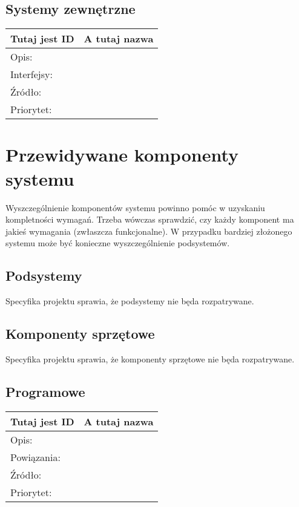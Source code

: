 \documentclass[a4paper,10pt]{article}
\begin{document}
\subsection{Systemy zewnętrzne}

\begin{center}
\begin{tabular}{|l|l|} \hline

Tutaj jest ID & A tutaj nazwa \\ \hline
Opis: &  \\ \hline
Interfejsy: &  \\ \hline
Źródło: &  \\ \hline
Priorytet: &  \\ \hline

\end{tabular}
\end{center}

\section{Przewidywane komponenty systemu}

Wyszczególnienie komponentów systemu powinno pomóc w uzyskaniu kompletności wymagań. Trzeba wówczas sprawdzić, czy każdy komponent ma jakieś wymagania (zwłaszcza funkcjonalne). W przypadku bardziej złożonego systemu może być konieczne wyszczególnienie podsystemów.

\subsection{Podsystemy}
Specyfika projektu sprawia, że podsystemy nie będa rozpatrywane.

\subsection{Komponenty sprzętowe}
Specyfika projektu sprawia, że komponenty sprzętowe nie będa rozpatrywane. 

\subsection{Programowe}

\begin{center}
\begin{tabular}{|l|l|} \hline

Tutaj jest ID & A tutaj nazwa \\ \hline
Opis: &  \\ \hline
Powiązania: &  \\ \hline
Źródło: &  \\ \hline
Priorytet: &  \\ \hline

\end{tabular}
\end{center}
\end{document}
